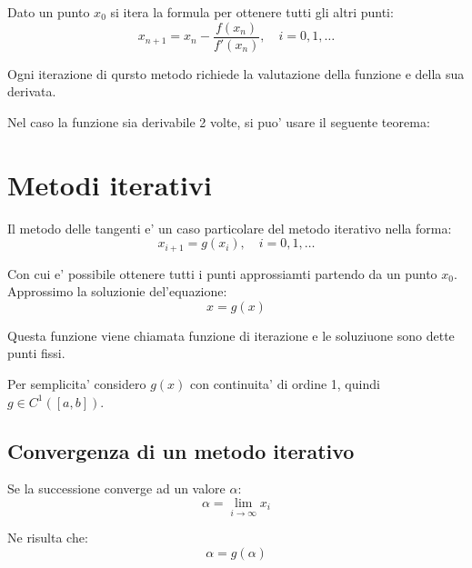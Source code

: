 Dato un punto $x_0$ si itera la formula per ottenere tutti gli altri punti:
\begin{equation}
  x_{n+1} = x_n - \frac{f(x_n)}{f'(x_n)}, \quad i = 0, 1, \dots
\end{equation}

Ogni iterazione di qursto metodo richiede la valutazione della funzione e della sua derivata.


Nel caso la funzione sia derivabile 2 volte, si puo' usare il seguente teorema:

\section{Metodi iterativi}
Il metodo delle tangenti e' un caso particolare del metodo iterativo nella forma:
\begin{equation*}
  x_{i+1} = g(x_i), \quad i = 0, 1, \dots
\end{equation*}

%

Con cui e' possibile ottenere tutti i punti approssiamti partendo da un punto $x_0$.
Approssimo la soluzionie del'equazione:
\begin{equation*}
  x = g(x)
\end{equation*}

Questa funzione viene chiamata funzione di iterazione e le soluziuone sono dette punti fissi.

Per semplicita' considero $g(x)$ con continuita' di ordine 1, quindi $g \in C^1([a, b])$.

\subsection{Convergenza di un metodo iterativo}

Se la successione converge ad un valore $\alpha$:
\begin{equation*}
  \alpha = \lim_{i \to \infty} x_i
\end{equation*}

Ne risulta che:
\begin{equation*}
  \alpha = g(\alpha)
\end{equation*}

